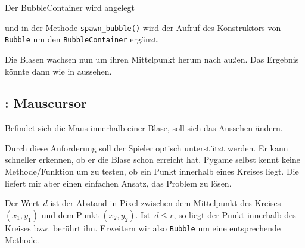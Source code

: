 
Der BubbleContainer wird angelegt


und in der Methode \texttt{spawn\_bubble()} wird der Aufruf des Konstruktors von \texttt{Bubble} um den \texttt{BubbleContainer} ergänzt.


Die Blasen wachsen nun um ihren Mittelpunkt herum nach außen. Das Ergebnis könnte dann wie in  aussehen.


\subsection{: Mauscursor}
    Befindet sich die Maus innerhalb einer Blase, soll sich das Aussehen ändern.
\er

Durch diese Anforderung soll der Spieler optisch unterstützt werden. Er kann schneller erkennen, ob er die Blase schon erreicht hat. Pygame selbst kennt keine Methode/Funktion um zu testen, ob ein Punkt innerhalb eines Kreises liegt. Die  liefert mir aber einen einfachen Ansatz, das Problem zu lösen. 

Der Wert~$d$ ist der Abstand in Pixel zwischen dem Mittelpunkt des Kreises $(x_1, y_1)$ und dem Punkt $(x_2, y_2)$. Ist~$d \leq r$, so liegt der Punkt innerhalb des Kreises bzw. berührt ihn. Erweitern wir also \texttt{Bubble} um eine entsprechende Methode.

